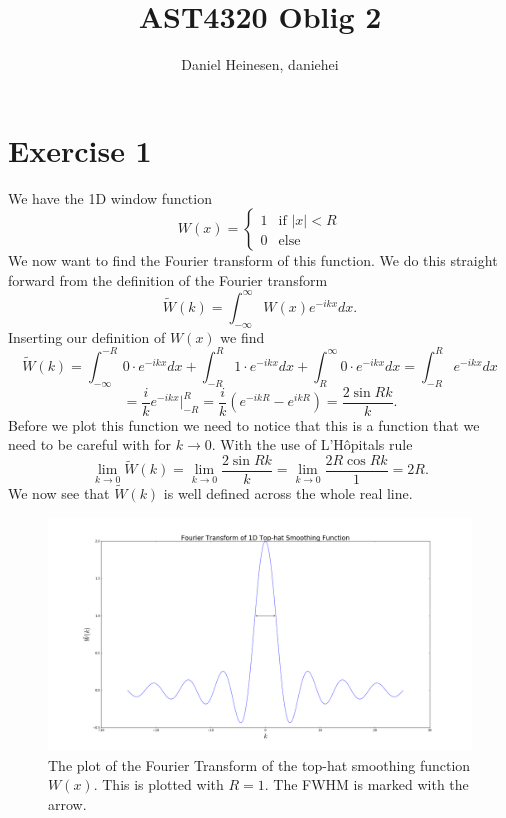 \documentclass[a4paper,norsk, 10pt]{article}
\title{AST4320 Oblig 2}
\author{Daniel Heinesen, daniehei}
\begin{document}
\maketitle
\section{Exercise 1}
We have the 1D window function
\begin{equation}
W(x) =
\left\{
	\begin{array}{ll}
		1  & \mbox{if } |x| < R \\
		0 & \mbox{else } 
	\end{array}
\right.
\end{equation}
We now want to find the Fourier transform of this function. We do this straight forward from the definition of the Fourier transform
\begin{equation}
\tilde{W}(k) = \int_{-\infty}^{\infty} W(x) e^{-ikx}dx.
\end{equation}
Inserting our definition of $W(x)$ we find
\begin{equation}
\tilde{W}(k) = \int_{-\infty}^{-R}0\cdot e^{-ikx}dx + \int_{-R}^{R}1\cdot e^{-ikx}dx + \int_{R}^{\infty}0\cdot e^{-ikx}dx = \int_{-R}^{R}e^{-ikx}dx
\end{equation}
\begin{equation}
= \frac{i}{k}e^{-ikx}\bigg|_{-R}^{R} = \frac{i}{k}\left(e^{-ikR} - e^{ikR}\right) = \frac{2\sin Rk}{k}.
\end{equation}
Before we plot this function we need to notice that this is a function that we need to be careful with for $k\rightarrow 0$. With the use of L'Hôpitals rule
\begin{equation}\label{eq:at_0}
 \lim_{ k\rightarrow 0} \tilde{W}(k) = \lim_{k\rightarrow 0} \frac{2 \sin Rk}{k}
= \lim_{k\rightarrow 0} \frac{2R\cos Rk}{1} = 2R. 
 \end{equation}
We now see that $\tilde{W}(k)$ is well defined across the whole real line.

\begin{figure}[H]
\centering
\includegraphics[scale=0.3]{fourier}
\caption{The plot of the Fourier Transform of the top-hat smoothing function $W(x)$. This is plotted with $R=1$. The FWHM is marked with the arrow.}\label{fig:fourier}
\end{figure}
\end{document}
